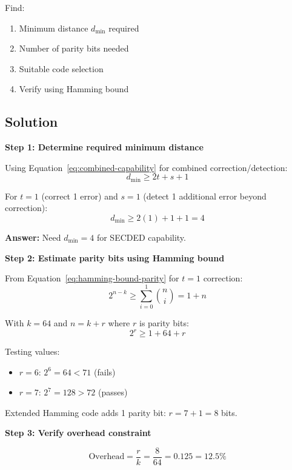 Find:
\begin{enumerate}
\item Minimum distance $d_{\min}$ required
\item Number of parity bits needed
\item Suitable code selection
\item Verify using Hamming bound
\end{enumerate}

\subsection*{Solution}

\textbf{Step 1: Determine required minimum distance}

Using Equation~\ref{eq:combined-capability} for combined correction/detection:
\begin{equation}
d_{\min} \geq 2t + s + 1
\end{equation}

For $t = 1$ (correct 1 error) and $s = 1$ (detect 1 additional error beyond correction):
\begin{equation}
d_{\min} \geq 2(1) + 1 + 1 = 4
\end{equation}

\textbf{Answer:} Need $d_{\min} = 4$ for SECDED capability.

\textbf{Step 2: Estimate parity bits using Hamming bound}

From Equation~\ref{eq:hamming-bound-parity} for $t = 1$ correction:
\begin{equation}
2^{n-k} \geq \sum_{i=0}^{1} \binom{n}{i} = 1 + n
\end{equation}

With $k = 64$ and $n = k + r$ where $r$ is parity bits:
\begin{equation}
2^r \geq 1 + 64 + r
\end{equation}

Testing values:
\begin{itemize}
\item $r = 6$: $2^6 = 64 < 71$ (fails)
\item $r = 7$: $2^7 = 128 > 72$ (passes)
\end{itemize}

Extended Hamming code adds 1 parity bit: $r = 7 + 1 = 8$ bits.

\textbf{Step 3: Verify overhead constraint}

\begin{equation}
\text{Overhead} = \frac{r}{k} = \frac{8}{64} = 0.125 = 12.5\%
\end{equation}

